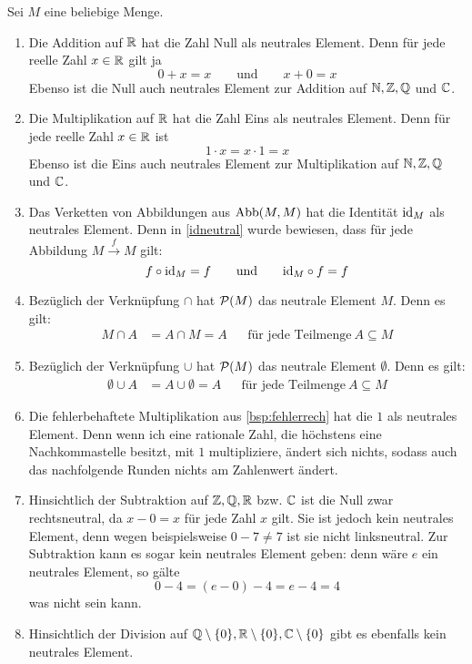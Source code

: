 \begin{bsp} \label{bsp:neutrales}
    Sei $M$ eine beliebige Menge.
    \begin{enumerate}
        \item Die Addition auf $\mathbb R$ hat die Zahl Null als neutrales Element. Denn für jede reelle Zahl $x\in \mathbb R$ gilt ja
            \[ 0+x=x \qquad\text{und}\qquad x+0=x \]
        Ebenso ist die Null auch neutrales Element zur Addition auf $\mathbb N,\mathbb Z,\mathbb Q$ und $\mathbb C$.
        \item Die Multiplikation auf $\mathbb R$ hat die Zahl Eins als neutrales Element. Denn für jede reelle Zahl $x\in \mathbb R$ ist
            \[ 1\cdot x = x\cdot 1= x \]
        Ebenso ist die Eins auch neutrales Element zur Multiplikation auf $\mathbb N,\mathbb Z,\mathbb Q$ und $\mathbb C$.
        \item Das Verketten von Abbildungen aus $\operatorname{Abb}(M,M)$ hat die Identität $\mathrm{id}_M$ als neutrales Element. Denn in \cref{idneutral} wurde bewiesen, dass für jede Abbildung $M\xrightarrow{f} M$ gilt:
            \[ f\circ \mathrm{id}_M = f \qquad\text{und}\qquad \mathrm{id}_M \circ f = f \]
        \item Bezüglich der Verknüpfung $\cap$ hat $\mathcal P(M)$ das neutrale Element $M$. Denn es gilt:
        \begin{align*}
            M\cap A & = A\cap M = A && \text{für jede Teilmenge}\ A\subseteq M
        \end{align*}
        \item Bezüglich der Verknüpfung $\cup$ hat $\mathcal P(M)$ das neutrale Element $\emptyset$. Denn es gilt:
        \begin{align*}
            \emptyset\cup A & = A\cup \emptyset = A && \text{für jede Teilmenge}\ A\subseteq M
        \end{align*}
        \item Die fehlerbehaftete Multiplikation aus \cref{bsp:fehlerrech} hat die $1$ als neutrales Element. Denn wenn ich eine rationale Zahl, die höchstens eine Nachkommastelle besitzt, mit $1$ multipliziere, ändert sich nichts, sodass auch das nachfolgende Runden nichts am Zahlenwert ändert.
        \item Hinsichtlich der Subtraktion auf $\mathbb Z,\mathbb Q,\mathbb R$ bzw. $\mathbb C$ ist die Null zwar rechtsneutral, da $x-0=x$ für jede Zahl $x$ gilt. Sie ist jedoch kein neutrales Element, denn wegen beispielsweise $0-7\neq 7$ ist sie nicht linksneutral. Zur Subtraktion kann es sogar kein neutrales Element geben: denn wäre $e$ ein neutrales Element, so gälte
            \[ 0-4 = (e-0)-4 = e-4 = 4 \]
        was nicht sein kann.
        \item Hinsichtlich der Division auf $\mathbb Q\setminus \{0\},\mathbb R\setminus \{0\},\mathbb C\setminus \{0\}$ gibt es ebenfalls kein neutrales Element.
    \end{enumerate}
\end{bsp}


